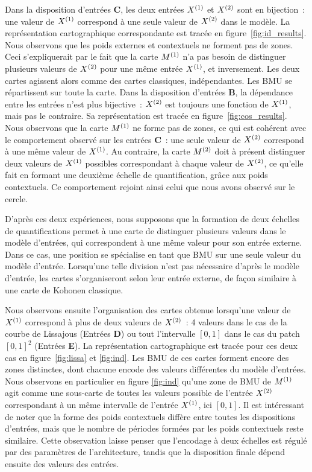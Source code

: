 \documentclass[../main]{subfiles}
\begin{document}
Dans la disposition d'entrées \textbf{C}, les deux entrées $X^{({1})}$ et $X^{({2})}$ sont en bijection~: une valeur de $X^{({1})}$ correspond à une seule valeur de $X^{({2})}$ dans le modèle.
La représentation cartographique correspondante est tracée en figure~\ref{fig:id_results}.
Nous observons que les poids externes et contextuels ne forment pas de zones. Ceci s'expliquerait par le fait que la carte $M^{({1})}$ n'a pas besoin de distinguer plusieurs valeurs de $X^{({2})}$ pour une même entrée $X^{({1})}$, et inversement. Les deux cartes agissent alors comme des cartes classiques, indépendantes. Les BMU se répartissent sur toute la carte.
Dans la disposition d'entrées \textbf{B}, la dépendance entre les entrées n'est plus bijective~: $X^{({2})}$ est toujours une fonction de $X^{({1})}$, mais pas le contraire. Sa représentation est tracée en figure~\ref{fig:cos_results}.
Nous observons que la carte $M^{({1})}$ ne forme pas de zones, ce qui est cohérent avec le comportement observé sur les entrées \textbf{C}~: une seule valeur de $X^{({2})}$ correspond à une même valeur de $X^{({1})}$.
Au contraire, la carte $M^{({2})}$ doit à présent distinguer deux valeurs de $X^{({1})}$ possibles correspondant à chaque valeur de $X^{({2})}$, ce qu'elle fait en formant une deuxième échelle de quantification, grâce aux poids contextuels. Ce comportement rejoint ainsi celui que nous avons observé sur le cercle.

D'après ces deux expériences, nous supposons que la formation de deux échelles de quantifications permet à une carte de distinguer plusieurs valeurs dans le modèle d'entrées, qui correspondent à une même valeur pour son entrée externe. Dans ce cas, une position se spécialise en tant que BMU sur une seule valeur du modèle d'entrée.
Lorsqu'une telle division n'est pas nécessaire d'après le modèle d'entrée, les cartes s'organiseront selon leur entrée externe, de façon similaire à une carte de Kohonen classique.


Nous observons ensuite l'organisation des cartes obtenue lorsqu'une valeur de $X^{({1})}$ correspond à plus de deux valeurs de $X^{({2})}$~: 4 valeurs dans le cas de la courbe de Lissajous (Entrées \textbf{D}) ou tout l'intervalle $[0,1]$ dans le cas du patch $[0,1]^2$ (Entrées \textbf{E}). 
La représentation cartographique est tracée pour ces deux cas en figure~\ref{fig:lissa} et \ref{fig:ind}.
Les BMU de ces cartes forment encore des zones distinctes, dont chacune encode des valeurs différentes du modèle d'entrées. Nous observons en particulier en figure \ref{fig:ind} qu'une zone de BMU de $M^{({1})}$ agit comme une \og sous-carte \fg de toutes les valeurs possible de l'entrée $X^{({2})}$ correspondant à un même intervalle de l'entrée  $X^{({1})}$, ici $[0,1]$.
Il est intéressant de noter que la forme des poids contextuels diffère entre toutes les dispositions d'entrées, mais que le nombre de \og périodes \fg{} formées par les poids contextuels reste similaire. Cette observation laisse penser que l'encodage à deux échelles est régulé par des paramètres de l'architecture, tandis que la disposition finale dépend ensuite des valeurs des entrées.
\end{document}
